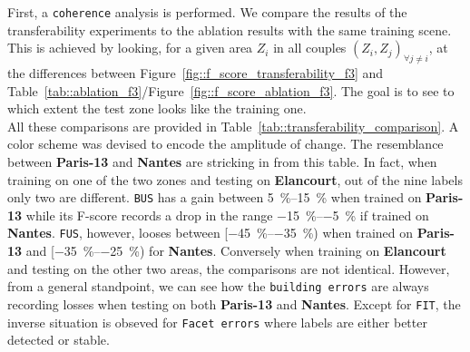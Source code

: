        First, a \texttt{coherence} analysis is performed.
        We compare the results of the transferability experiments to the ablation results with the same training scene.
        This is achieved by looking, for a given area $Z_i$ in all couples $(Z_i, Z_j)_{\forall j \neq i}$, at the differences between Figure~\ref{fig::f_score_transferability_f3} and Table~\ref{tab::ablation_f3}/Figure~\ref{fig::f_score_ablation_f3}.
        The goal is to see to which extent the test zone looks like the training one.\\

        All these comparisons are provided in Table~\ref{tab::transferability_comparison}.
        A color scheme was devised to encode the amplitude of change.
        The resemblance between \textbf{Paris-13} and \textbf{Nantes} are stricking in from this table.
        In fact, when training on one of the two zones and testing on \textbf{Elancourt}, out of the nine labels only two are different.
        \texttt{BUS} has a gain between \SIrange[range-phrase={and }]{5}{15}{\percent} when trained on \textbf{Paris-13} while its F-score records a drop in the range \SIrange{-15}{-5}{\percent} if trained on \textbf{Nantes}.
        \texttt{FUS}, however, looses between [\SIrange[range-phrase={, }]{-45}{-35}{\percent}) when trained on \textbf{Paris-13} and [\SIrange[range-phrase={, }]{-35}{-25}{\percent}) for \textbf{Nantes}.
        Conversely when training on \textbf{Elancourt} and testing on the other two areas, the comparisons are not identical.
        However, from a general standpoint, we can see how the \texttt{building errors} are always recording losses when testing on both \textbf{Paris-13} and \textbf{Nantes}.
        Except for \texttt{FIT}, the inverse situation is obseved for \texttt{Facet errors} where labels are either better detected or stable.

